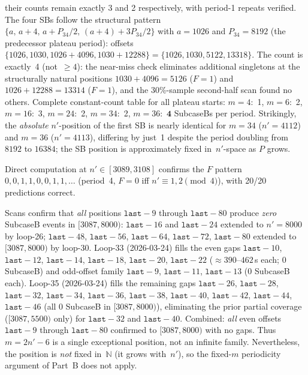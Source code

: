 \documentclass[11pt]{article}
\theoremstyle{plain}
\theoremstyle{definition}
\begin{document}
their counts remain exactly 3 and 2 respectively, with period-1 repeats verified.
The four SBs follow the structural pattern $\{a,\, a{+}4,\, a{+}P_{34}/2,\, (a{+}4){+}3P_{34}/2\}$
with $a=1026$ and $P_{34}=8192$ (the predecessor plateau period):
offsets $\{1026,1030,1026{+}4096,1030{+}12288\} = \{1026,1030,5122,13318\}$.
The count is exactly~4 (not~$\geq 4$): the near-miss check eliminates additional
singletons at the structurally natural positions $1030{+}4096=5126$ ($F=1$)
and $1026{+}12288=13314$ ($F=1$), and the 30\%-sample second-half scan found no others.
Complete constant-count table for all plateau starts:
$m=4$:~1, $m=6$:~2, $m=16$:~3, $m=24$:~2, $m=34$:~2, $m=36$:~$\mathbf{4}$ SubcaseBs per period.
Strikingly, the \emph{absolute} $n'$-position of the first SB is nearly identical for
$m=34$ ($n'=4112$) and $m=36$ ($n'=4113$), differing by just~1 despite the period doubling
from $8192$ to $16384$; the SB position is approximately fixed in~$n'$-space as $P$ grows.

Direct computation at $n'\in[3089,3108]$ confirms the $F$ pattern $0,0,1,1,0,0,1,1,\ldots$
(period~4, $F=0$ iff $n'\equiv 1,2\pmod{4}$), with 20/20 predictions correct.

Scans confirm that \emph{all} positions $\mathtt{last}{-}9$
through $\mathtt{last}{-}80$ produce \emph{zero} SubcaseB events in $[3087, 8000)$:
$\mathtt{last}{-}16$ and $\mathtt{last}{-}24$ extended to $n'=8000$ by loop-26;
$\mathtt{last}{-}48$, $\mathtt{last}{-}56$, $\mathtt{last}{-}64$,
$\mathtt{last}{-}72$, $\mathtt{last}{-}80$ extended to $[3087, 8000)$ by loop-30.
Loop-33 (2026-03-24) fills the even gaps $\mathtt{last}{-}10$, $\mathtt{last}{-}12$,
$\mathtt{last}{-}14$, $\mathtt{last}{-}18$, $\mathtt{last}{-}20$, $\mathtt{last}{-}22$
(${\approx}390$--$462$\,s each; 0 SubcaseB) and odd-offset family $\mathtt{last}{-}9$,
$\mathtt{last}{-}11$, $\mathtt{last}{-}13$ (0 SubcaseB each).
Loop-35 (2026-03-24) fills the remaining gaps $\mathtt{last}{-}26$,
$\mathtt{last}{-}28$, $\mathtt{last}{-}32$, $\mathtt{last}{-}34$, $\mathtt{last}{-}36$,
$\mathtt{last}{-}38$, $\mathtt{last}{-}40$, $\mathtt{last}{-}42$, $\mathtt{last}{-}44$,
$\mathtt{last}{-}46$ (all 0 SubcaseB in $[3087, 8000)$), eliminating the prior
partial coverage ($[3087, 5500)$ only) for $\mathtt{last}{-}32$ and $\mathtt{last}{-}40$.
Combined: \emph{all} even offsets $\mathtt{last}{-}9$ through $\mathtt{last}{-}80$ confirmed
to $[3087, 8000)$ with no gaps.
Thus $m = 2n'{-}6$ is a single exceptional position, not an infinite family.  Nevertheless, the position is \emph{not} fixed in~$\mathbb{N}$
(it grows with~$n'$), so the fixed-$m$ periodicity argument of Part~B does not apply.
\end{document}
